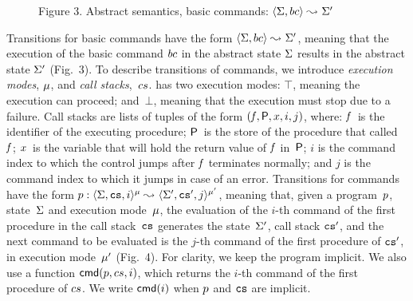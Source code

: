 \begin{figure}[t!]
{\begin{mathpar}
\end{mathpar}}
\vspace*{-0.5cm}
 \captionsetup{format=nastyCaption}
\caption*{{\small Figure 3. Abstract semantics, basic commands: $\absbsemrule{\absstate, \bcmd}{\absstate'}{}$}}\label{abs:sem:bcmds:fig}
\vspace*{-0.4cm}
\end{figure}


Transitions for
basic commands have the form 
$\absbsemrule{\absstate, \bcmd}{\absstate'}{}$, meaning that the execution of the basic command 
$\bcmd$ in the abstract state $\absstate$ results in the abstract state $\absstate'$ (Fig.~3). 
%
To describe transitions of commands, we introduce \emph{execution modes}, $\mode$, and 
\emph{call stacks},~$\cs$.  \jsil has two execution modes: 
$\top$, meaning the execution can proceed; and~$\bot$, meaning that the execution must stop due to a failure. Call stacks are lists of tuples of the form $(\pid, \absstore, \jvar, i, j)$, where: 
$\pid$~is the identifier of the executing procedure;
$\absstore$~is the store of the procedure that called~$\pid$; 
$\jvar$~is the variable that will hold the return value of $\pid$ in~$\absstore$; 
$i$ is the command index to which the control jumps after $\pid$ terminates normally; 
and $j$ is the command index to which it jumps in case of an error. 
Transitions for  commands have the form  $\prog: \abssemrule{\absstate, \abscs, i}{\absstate', \abscs', j}{\mode}{\mode'}{}$, 
meaning that, given a program~$\prog$, state~$\absstate$ and execution mode~$\mode$, the evaluation of the $i$-th command of the first procedure in the 
call stack~$\abscs$ generates 
the state~$\absstate'$, call stack $\abscs'$,  and the next command to be evaluated is the $j$-th command of the first procedure 
of $\abscs'$, in execution mode~$\mode'$ (Fig.~4). 
For clarity, we keep the program implicit. We also use a function $\ccmd{\prog, \cs, i}$, which 
returns the $i$-th command of the first procedure of $\cs$. We write $\ccmd{i}$ when $\prog$ and $\abscs$ are implicit.


